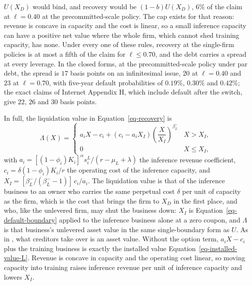 \documentclass[
  11pt,
  letterpaper,
]{scrartcl}
\newcounter{none} %
\begin{document}
\(U(X_D)\) would bind, and recovery would be \((1-b)U(X_D)\), \(6\%\) of
the claim at \(\ell = 0.40\) at the precommitted-scale policy. The cap
exists for that reason: revenue is concave in capacity and the cost is
linear, so a small inference capacity can have a positive net value
where the whole firm, which cannot shed training capacity, has none.
Under every one of these rules, recovery at the single-firm policies is
at most a fifth of the claim for \(\ell \leq 0.70\), and the debt
carries a spread at every leverage. In the closed forms, at the
precommitted-scale policy under par debt, the spread is \(17\) basis
points on an infinitesimal issue, \(20\) at \(\ell = 0.40\) and \(23\)
at \(\ell = 0.70\), with five-year default probabilities of \(0.19\%\),
\(0.30\%\) and \(0.42\%\); the exact claims of Internet Appendix H,
which include default after the switch, give \(22\), \(26\) and \(30\)
basis points.

In full, the liquidation value in Equation~\ref{eq-recovery} is \[
\Lambda(X) = \begin{cases} a_i X - c_i + (c_i - a_i X_I)\left(\dfrac{X}{X_I}\right)^{\beta_L^-} & X > X_I, \\ 0 & X \leq X_I, \end{cases}
\] with \(a_i = [(1-\phi_i)K_i]^\alpha s_i^L/(r - \mu_L + \lambda)\) the
inference revenue coefficient, \(c_i = \delta(1-\phi_i)K_i/r\) the
operating cost of the inference capacity, and
\(X_I = [\beta_L^-/(\beta_L^- - 1)]\, c_i/a_i\). The liquidation value
is that of the inference business to an owner who carries the same
perpetual cost \(\delta\) per unit of capacity as the firm, which is the
cost that brings the firm to \(X_D\) in the first place, and who, like
the unlevered firm, may shut the business down: \(X_I\) is
Equation~\ref{eq-default-boundary} applied to the inference business
alone at a zero coupon, and \(\Lambda\) is that business's unlevered
asset value in the same single-boundary form as \(U\). As in
\citet{leland1994corporate}, what creditors take over is an asset value.
Without the option term, \(a_i X - c_i\) plus the training business is
exactly the installed value Equation~\ref{eq-installed-value-L}. Revenue
is concave in capacity and the operating cost linear, so moving capacity
into training raises inference revenue per unit of inference capacity
and lowers \(X_I\).
\end{document}
